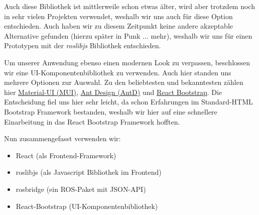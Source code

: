 \begin{flushleft}
    Auch diese Bibliothek ist mittlerweile schon etwas älter, wird aber trotzdem noch in sehr vielen Projekten verwendet, weshalb wir uns auch für diese Option entschieden. Auch haben wir zu diesem Zeitpunkt keine andere akzeptable Alternative gefunden (hierzu später in Punk ... mehr), weshalb wir uns für einen Prototypen mit der \textit{roslibjs} Bibliothek entschieden. 

    Um unserer Anwendung ebenso einen modernen Look zu verpassen, beschlossen wir eine UI-Komponentenbibliothek zu verwenden. Auch hier standen uns mehrere Optionen zur Auswahl. Zu den beliebtesten und bekanntesten zählen hier \href{https://mui.com}{Material-UI (MUI)}, \href{https://ant.design}{Ant Design (AntD)} und \href{https://react-bootstrap.github.io}{React Bootstrap}. Die Entscheidung fiel uns hier sehr leicht, da schon Erfahrungen im Standard-HTML Bootstrap Framework bestanden, weshalb wir hier auf eine schnellere Einarbeitung in das React Bootstrap Framework hofften.

    Nun zusammengefasst verwenden wir:
    \begin{itemize}
        \item React (als Frontend-Framework)
        \item roslibjs (als Javascript Bibliothek im Frontend)
        \item rosbridge (ein ROS-Paket mit JSON-API)
        \item React-Bootstrap (UI-Komponentenbibliothek)
    \end{itemize}
\end{flushleft}